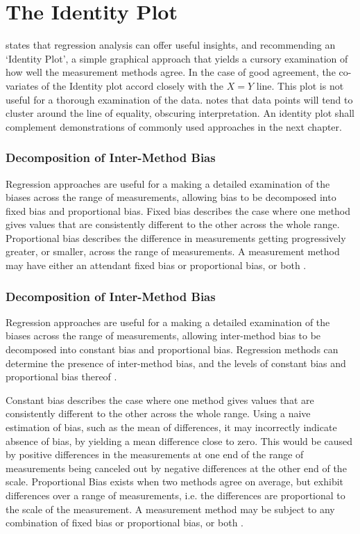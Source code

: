 \documentclass[12pt, a4paper]{report}
\theoremstyle{plain}
\theoremstyle{definition}
\theoremstyle{remark}
\begin{document}
	
	
	
	
	

	\section{The Identity Plot}
	\citet{BA83} states that regression analysis can offer useful insights, and recommending an `Identity Plot', a simple graphical approach that yields a cursory examination of how well the measurement methods agree. In the case of good agreement, the co-variates of the Identity plot accord closely with the $X=Y$ line. This plot is not useful for a thorough examination of the data. \citet{BritHypSoc} notes that data points will tend to cluster around the line of equality,
	obscuring interpretation. An identity plot shall complement demonstrations of commonly used approaches in the next chapter.
	

	\subsubsection*{Decomposition of Inter-Method Bias}
Regression approaches are useful for a making a detailed examination of the biases across the range of measurements, allowing bias to be decomposed into fixed bias and proportional bias.
Fixed bias describes the case where one method gives values that are consistently different
to the other across the whole range. Proportional
bias describes the difference in measurements getting progressively greater, or smaller, across the range of measurements. A measurement method may have either an attendant fixed bias or proportional bias, or both \citep{ludbrook}. %

	
	\subsubsection*{Decomposition of Inter-Method Bias}
Regression approaches are useful for a making a detailed examination of the biases across the range of measurements, allowing inter-method bias to be decomposed into constant bias and proportional bias. Regression methods can determine the presence of inter-method bias, and the levels of constant bias and proportional bias thereof \cite{ludbrook97,ludbrook02}. 

Constant bias describes the case where one method gives values that are consistently different to the other across the whole range. Using a naive estimation of bias, such as the mean of differences, it may incorrectly indicate absence of bias, by yielding a mean difference close to zero. This would be caused by positive differences in the measurements at one end of the range of measurements being canceled out by negative differences at the other end of the scale. Proportional Bias exists when two methods agree on average, but exhibit differences over a range of measurements, i.e. the differences are proportional to the scale of the measurement.	A measurement method may be subject to any combination of fixed bias or proportional bias, or both \citep{ludbrook02}. 
	
\end{document}
